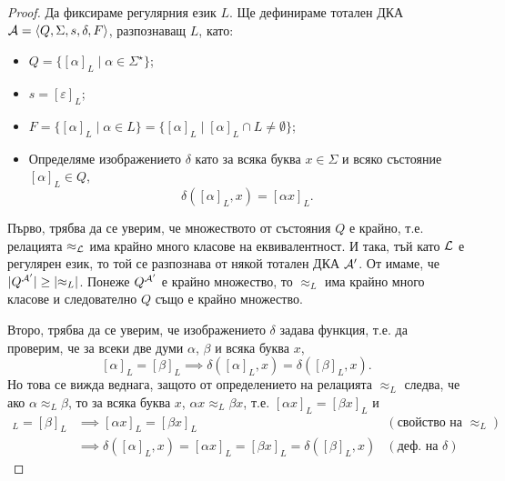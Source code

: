 \begin{proof}
  Да фиксираме регулярния език $L$.
  Ще дефинираме тотален ДКА $\mathcal{A} = \langle{Q,\Sigma,s,\delta,F}\rangle$, разпознаващ $L$, като:
  \begin{itemize}
  \item
    $Q = \{[\alpha]_L\mid \alpha\in \Sigma^\star\}$;
  \item
    $s = [\varepsilon]_L$;
  \item
    $F = \{[\alpha]_L\mid \alpha\in L\} = \{[\alpha]_L \mid [\alpha]_L \cap L \neq \emptyset\}$;
  \item
    Определяме изображението $\delta$ като 
    за всяка буква $x \in \Sigma$ и всяко състояние $[\alpha]_L\in Q$, 
    \[\delta([\alpha]_L,x) = [\alpha x]_L.\]
  \end{itemize}
  
  Първо, трябва да се уверим, че множеството от състояния $Q$ е крайно, т.е.
  релацията $\approx_{\mathcal{L}}$ има крайно много класове на еквивалентност.
  И така, тъй като $\mathcal{L}$ е регулярен език, то той се разпознава от някой тотален ДКА $\mathcal{A}'$.
  От  имаме, че $\lvert{Q^{\mathcal{A}'}}\rvert \geq \lvert{\approx_L}\rvert$.
  Понеже $Q^{\mathcal{A}'}$ е крайно множество, то $\approx_L$ има крайно много класове и 
  следователно $Q$ също е крайно множество.

  Второ, трябва да се уверим, че изображението $\delta$ задава функция, т.е. 
  да проверим, че за всеки две думи $\alpha$, $\beta$ и всяка буква $x$,
  \[[\alpha]_L = [\beta]_L \implies \delta([\alpha]_L,x) = \delta([\beta]_L,x).\]
  Но това се вижда веднага, защото от определението на релацията $\approx_L$ следва, че
  ако $\alpha \approx_L \beta$, то за всяка буква $x$, $\alpha x \approx_L \beta x$,
  т.е. $[\alpha x]_L = [\beta x]_L$ и 
  \begin{align*}
    [\alpha]_L = [\beta]_L & \implies [\alpha x]_L = [\beta x]_L & (\text{свойство на }\approx_L)\\
    & \implies \delta([\alpha]_L,x) = [\alpha x]_L = [\beta x]_L = \delta([\beta]_L,x) & (\text{деф. на }\delta)
  \end{align*}
  

\end{proof}
